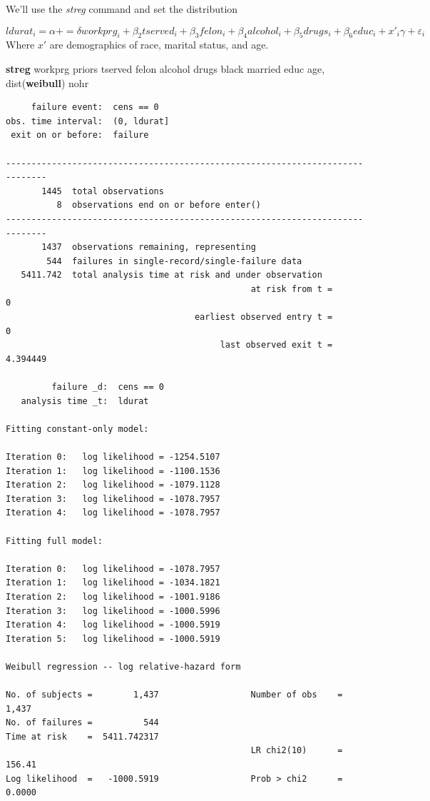 \documentclass[
]{book}
\newenvironment{Shaded}{\begin{snugshade}}{\end{snugshade}}
\newcommand{\BaseNTok}[1]{\textcolor[rgb]{0.00,0.00,0.81}{#1}}
\newcommand{\KeywordTok}[1]{\textcolor[rgb]{0.13,0.29,0.53}{\textbf{#1}}}
\newcommand{\NormalTok}[1]{#1}
\begin{document}
We'll use the \emph{streg} command and set the distribution

\[ ldurat_i = \alpha + =\delta workprg_i + \beta_2 tserved_i + \beta_3 felon_i + \beta_4 alcohol_i + \beta_5 drugs_i + \beta_6 educ_i + x'_i \gamma + \varepsilon_i\]
Where \(x'\) are demographics of race, marital status, and age.

\begin{Shaded}
\begin{Highlighting}[]
\KeywordTok{streg}\NormalTok{ workprg priors tserved felon alcohol drugs }\BaseNTok{black}\NormalTok{ married educ age, dist(}\KeywordTok{weibull}\NormalTok{) nohr}
\end{Highlighting}
\end{Shaded}

\begin{verbatim}
     failure event:  cens == 0
obs. time interval:  (0, ldurat]
 exit on or before:  failure

------------------------------------------------------------------------------
       1445  total observations
          8  observations end on or before enter()
------------------------------------------------------------------------------
       1437  observations remaining, representing
        544  failures in single-record/single-failure data
   5411.742  total analysis time at risk and under observation
                                                at risk from t =         0
                                     earliest observed entry t =         0
                                          last observed exit t =  4.394449

         failure _d:  cens == 0
   analysis time _t:  ldurat

Fitting constant-only model:

Iteration 0:   log likelihood = -1254.5107
Iteration 1:   log likelihood = -1100.1536
Iteration 2:   log likelihood = -1079.1128
Iteration 3:   log likelihood = -1078.7957
Iteration 4:   log likelihood = -1078.7957

Fitting full model:

Iteration 0:   log likelihood = -1078.7957  
Iteration 1:   log likelihood = -1034.1821  
Iteration 2:   log likelihood = -1001.9186  
Iteration 3:   log likelihood = -1000.5996  
Iteration 4:   log likelihood = -1000.5919  
Iteration 5:   log likelihood = -1000.5919  

Weibull regression -- log relative-hazard form 

No. of subjects =        1,437                  Number of obs    =       1,437
No. of failures =          544
Time at risk    =  5411.742317
                                                LR chi2(10)      =      156.41
Log likelihood  =   -1000.5919                  Prob > chi2      =      0.0000


\end{verbatim}
\end{document}
